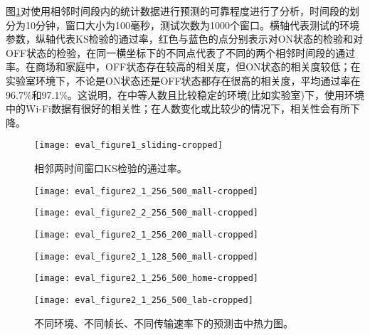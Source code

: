 图\ref{fig:kstest}对使用相邻时间段内的统计数据进行预测的可靠程度进行了分析，时间段的划分为10分钟，窗口大小为100毫秒，测试次数为1000个窗口。横轴代表测试的环境参数，纵轴代表KS检验的通过率，红色与蓝色的点分别表示对ON状态的检验和对OFF状态的检验，在同一横坐标下的不同点代表了不同的两个相邻时间段的通过率。在商场和家庭中，OFF状态存在较高的相关度，但ON状态的相关度较低；在实验室环境下，不论是ON状态还是OFF状态都存在很高的相关度，平均通过率在96.7\%和97.1\%。这说明，在中等人数且比较稳定的环境(比如实验室)下，使用环境中的Wi-Fi数据有很好的相关性；在人数变化或比较少的情况下，相关性会有所下降。
\begin{figure}[t]
	\centering
	\texttt{[image: eval\_figure1\_sliding-cropped]}
	\caption{相邻两时间窗口KS检验的通过率。}
	\label{fig:kstest}
\end{figure}
\begin{figure}[t]
	\begin{minipage}[b]{.32\linewidth}
		\texttt{[image: eval\_figure2\_1\_256\_500\_mall-cropped]}
		\label{fig:hitmap_256_500_0.6_mall}
	\end{minipage}
	\hfill
	\begin{minipage}[b]{.32\linewidth}
		\texttt{[image: eval\_figure2\_2\_256\_500\_mall-cropped]}
		\label{fig:hitmap_256_500_0.5_mall}
	\end{minipage}
	\hfill
	\begin{minipage}[b]{.32\linewidth}
		\texttt{[image: eval\_figure2\_1\_256\_200\_mall-cropped]}
		\label{fig:hitmap_256_200_0.6_mall}
	\end{minipage}
	
	\begin{minipage}[b]{.32\linewidth}
		\texttt{[image: eval\_figure2\_1\_128\_500\_mall-cropped]}
		\label{fig:hitmap_128_500_0.6_mall}
	\end{minipage}
	\hfill
	\begin{minipage}[b]{.32\linewidth}
		\texttt{[image: eval\_figure2\_1\_256\_500\_home-cropped]}
		\label{fig:hitmap_256_500_0.6_home}
	\end{minipage}
	\hfill
	\begin{minipage}[b]{.32\linewidth}
		\texttt{[image: eval\_figure2\_1\_256\_500\_lab-cropped]}
		\label{fig:hitmap_256_500_0.6_lab}
	\end{minipage}
	\caption{不同环境、不同帧长、不同传输速率下的预测击中热力图。}\label{fig:hitmap}
\end{figure}

